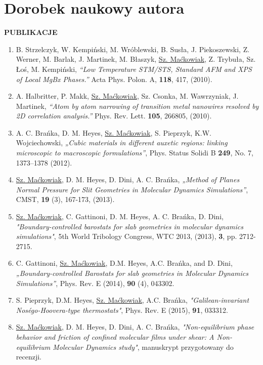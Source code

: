 \documentclass[12pt,a4paper,openright]{report} %
\begin{document}
\chapter{Dorobek naukowy autora}
\noindent
\textbf{PUBLIKACJE}
\begin{enumerate}
\item B. Strzelczyk, W. Kempiński, M. Wróblewski, B. Susła, J. Piekoszewski, Z. Werner, M. Barlak, J. Martinek, M. Błaszyk, \underline{Sz. Maćkowiak}, Z. Trybuła, Sz. Łoś, M. Kempiński, \textit{“Low Temperature STM/STS, Standard AFM and XPS of Local MgBx Phases.”} Acta Phys. Polon. A, \textbf{118}, 417, (2010).
%
\item A. Halbritter, P. Makk, \underline{Sz. Maćkowiak}, Sz. Csonka, M. Wawrzyniak, J. Martinek, \textit{“Atom by atom narrowing of transition metal nanowires resolved by 2D correlation analysis.”} Phys. Rev. Lett. \textbf{105}, 266805, (2010). 
%
\item A. C. Brańka, D. M. Heyes, \underline{Sz. Maćkowiak}, S. Pieprzyk, K.W. Wojciechowski, \textit{„Cubic materials in different auxetic regions: linking microscopic to macroscopic formulations”}, Phys. Status Solidi B \textbf{249}, No. 7, 1373–1378 (2012).
%
\item \underline{Sz. Maćkowiak}, D. M. Heyes, D. Dini, A. C. Brańka, \textit{„Method of Planes Normal Pressure for Slit Geometries in Molecular Dynamics Simulations”}, CMST, \textbf{19} (3), 167-173, (2013).
%
\item \underline{Sz. Maćkowiak}, C. Gattinoni, D. M. Heyes, A. C. Brańka, D. Dini, \textit{"Boundary-controlled barostats for slab geometries in molecular dynamics simulations"}, 5th World Tribology Congress, WTC 2013, (2013), \textbf{3}, pp. 2712-2715.
%
\item C. Gattinoni, \underline{Sz. Maćkowiak}, D.M. Heyes, A.C. Brańka, and D. Dini, \textit{„Boundary-controlled Barostats for slab geometries in Molecular Dynamics Simulations”}, Phys. Rev. E (2014), \textbf{90} (4), 043302.
%
\item S. Pieprzyk, D.M. Heyes, \underline{Sz. Maćkowiak}, A.C. Brańka,  \textit{"Galilean-invariant Nos\'{e}go-Hoovera-type thermostats"}, Phys. Rev. E (2015), \textbf{91}, 033312.
%
\item \underline{Sz. Maćkowiak}, D. M. Heyes, D. Dini, A. C. Brańka, \textit{"Non-equilibrium phase behavior and friction of confined molecular
films under shear: A Non-equilibrium Molecular Dynamics study"}, manuskrypt przygotowany do recenzji.

\end{enumerate}
\end{document}
